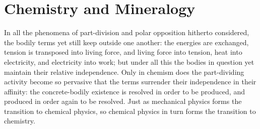 \documentclass[12pt]{book}
\begin{document}
\section{Chemistry and Mineralogy}
\label{sec:15}

\noindent In all the phenomena of part-division and polar opposition hitherto
considered, the bodily terms yet still keep outside one another: the energies are
exchanged, tension is transposed into living force, and living force into tension,
heat into electricity, and electricity into work; but under all this the bodies in
question yet maintain their relative independence. Only in chemism does the
part-dividing activity become so pervasive that the terms surrender their
independence in their affinity: the concrete-bodily existence is resolved in order
to be produced, and produced in order again to be resolved. Just as mechanical
physics forms the transition to chemical physics, so chemical physics in turn forms
the transition to chemistry.
\end{document}
